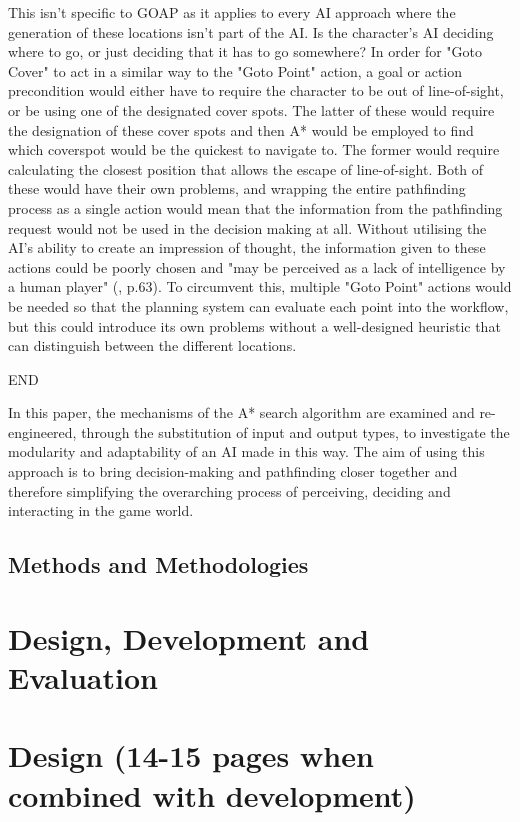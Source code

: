 \documentclass[11pt, a4paper]{article}
\begin{document}
This isn't specific to GOAP as it applies to every AI approach where the generation of these locations isn't part of the AI. Is the character's AI deciding where to go, or just deciding that it has to go somewhere? In order for "Goto Cover" to act in a similar way to the "Goto Point" action, a goal or action precondition would either have to require the character to be out of line-of-sight, or be using one of the designated cover spots. The latter of these would require the designation of these cover spots and then A* would be employed to find which coverspot would be the quickest to navigate to. The former would require calculating the closest position that allows the escape of line-of-sight. Both of these would have their own problems, and wrapping the entire pathfinding process as a single action would mean that the information from the pathfinding request would not be used in the decision making at all. Without utilising the AI's ability to create an impression of thought, the information given to these actions could be poorly chosen and "may be perceived as a lack of intelligence by a human player" (\cite{graham2003pathfinding}, p.63). To circumvent this, multiple "Goto Point" actions would be needed so that the planning system can evaluate each point into the workflow, but this could introduce its own problems without a well-designed heuristic that can distinguish between the different locations.





END

In this paper, the mechanisms of the A* search algorithm are examined and re-engineered, through the substitution of input and output types, to investigate the modularity and adaptability of an AI made in this way. The aim of using this approach is to bring decision-making and pathfinding closer together and therefore simplifying the overarching process of perceiving, deciding and interacting in the game world.



\subsection{Methods and Methodologies}

\section {Design, Development and Evaluation}

\section{Design (14-15 pages when combined with development)}
\end{document}
